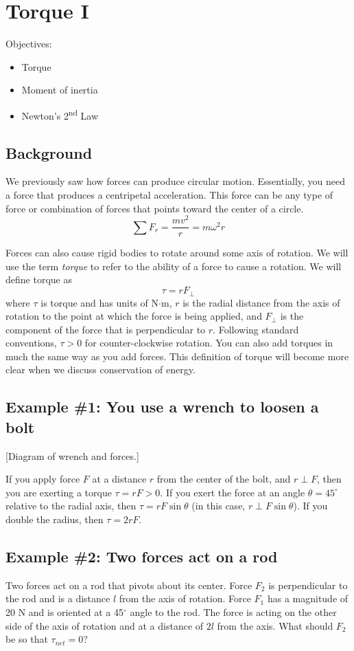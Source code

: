 \section{Torque I}
Objectives:
\begin{itemize}
\item Torque
\item Moment of inertia
\item Newton's 2\textsuperscript{nd} Law
\end{itemize}

\subsection{Background}
We previously saw how forces can produce circular motion. Essentially, you need a force that produces a centripetal acceleration. This force can be any type of force or combination of forces that points toward the center of a circle.
$$\sum F_r=\frac{mv^2}{r}=m\omega^2r$$

Forces can also cause rigid bodies to rotate around some axis of rotation. We will use the term \textit{torque} to refer to the ability of a force to cause a rotation. We will define torque as
$$\boxed{\tau=rF_\perp}$$
where $\tau$ is torque and has units of N$\cdot$m, $r$ is the radial distance from the axis of rotation to the point at which the force is being applied, and $F_\perp$ is the component of the force that is perpendicular to $r$. Following standard conventions, $\tau>0$ for counter-clockwise rotation. You can also add torques in much the same way as you add forces. This definition of torque will become more clear when we discuss conservation of energy.


\subsection{Example \#1: You use a wrench to loosen a bolt} 
[Diagram of wrench and forces.]
\vspace{5cm}

If you apply force $F$ at a distance $r$ from the center of the bolt, and $r\perp F$, then you are exerting a torque $\tau=rF>0$.  If you exert the force at an angle $\theta=45^\circ$ relative to the radial axis, then $\tau=rF\sin\theta$ (in this case, $r\perp F\sin\theta$). If you double the radius, then $\tau=2rF$.

\subsection{Example \#2: Two forces act on a rod}
Two forces act on a rod that pivots about its center. Force $F_2$ is perpendicular to the rod and is a distance $l$ from the axis of rotation. Force $F_1$ has a magnitude of 20 N and is oriented at a 45$^\circ$ angle to the rod. The force is acting on the other side of the axis of rotation and at a distance of $2l$ from the axis. What should $F_2$ be so that $\tau_{net}=0$?
\vspace{5cm}

